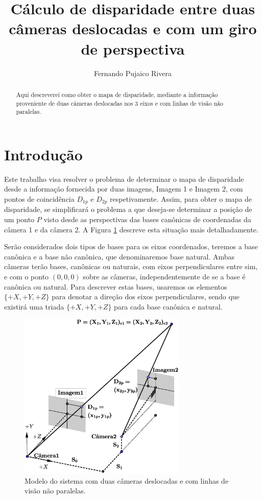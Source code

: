 \documentclass[a4paper,10pt]{article}
\title{Cálculo de disparidade entre duas câmeras deslocadas e com um giro de perspectiva }
\author{Fernando Pujaico Rivera}
\begin{document}
\maketitle

\begin{abstract}
Aqui descreverei como obter o mapa de disparidade, mediante a informação proveniente de  duas câmeras 
deslocadas nos 3 eixos e com linhas de visão não paralelas.
\end{abstract}

\section{Introdução}

Este trabalho visa resolver o problema de determinar o mapa de disparidade 
desde a informação fornecida por duas imagens, Imagem 1 e Imagem 2, com pontos de 
coincidência $D_{1p}$ e $D_{2p}$ respetivamente.
Assim, para obter o mapa de disparidade,
se simplificará o problema a que deseja-se determinar a posição de um ponto $P$ 
visto desde as perspectivas das bases canônicas de coordenadas da câmera 1 e da câmera 2.
A Figura \ref{fig:modelosimple} descreve esta situação mais detalhadamente.

Serão considerados dois tipos de bases para os eixos coordenados, teremos a base canônica
e a base não canônica, que denominaremos base natural.
Ambas câmeras terão bases, canônicas ou naturais, com eixos perpendiculares entre sim, e com o ponto $(0,0,0)$ 
sobre as câmeras, independentemente de se a base é canônica ou natural.
Para descrever estas bases, usaremos os elementos $\{+X,+Y,+Z\}$ para denotar a direção 
dos eixos perpendiculares, sendo que existirá uma triada $\{+X,+Y,+Z\}$ para cada 
base canônica e natural.


\begin{figure}[!ht]
\center
 \includegraphics[width=8.0cm]{./images/Modelo.eps}
\caption{Modelo do sistema com duas câmeras deslocadas e com linhas de visão não paralelas.}
\label{fig:modelosimple}
\end{figure} 
\end{document}
